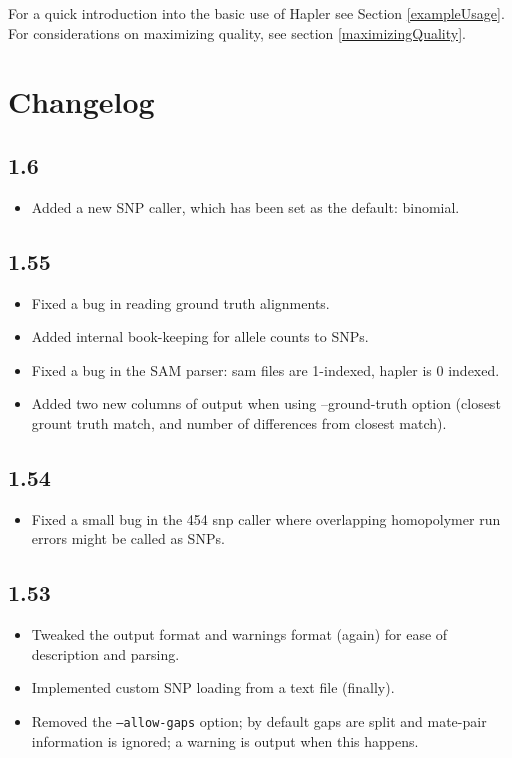 \documentclass[11pt]{llncs}
\begin{document}
For a quick introduction into the basic use of Hapler see Section \ref{exampleUsage}. For considerations on maximizing quality, see section 
\ref{maximizingQuality}.






\newpage
\section{Changelog}
\label{changelog}



	  \subsection*{1.6}
\begin{itemize}	  
\item Added a new SNP caller, which has been set as the default: binomial.
\end{itemize}


	  \subsection*{1.55}
\begin{itemize}	  
\item Fixed a bug in reading ground truth alignments.
\item Added internal book-keeping for allele counts to SNPs.
\item Fixed a bug in the SAM parser: sam files are 1-indexed, hapler is 0 indexed.
\item Added two new columns of output when using --ground-truth option (closest grount truth match, and number of differences from closest match).
\end{itemize}


	  \subsection*{1.54}
\begin{itemize}	  
\item Fixed a small bug in the 454 snp caller where overlapping homopolymer run errors might be called as SNPs.
\end{itemize}

	  \subsection*{1.53}
\begin{itemize}	  
\item Tweaked the output format and warnings format (again) for ease of description and parsing.
\item Implemented custom SNP loading from a text file (finally).
\item Removed the \texttt{--allow-gaps} option; by default gaps are split and mate-pair information is ignored; a warning is output when this happens.
\end{itemize}
\end{document}
